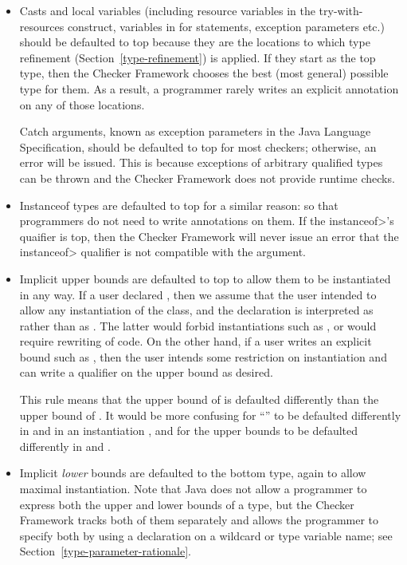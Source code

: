 \begin{itemize}
\item
Casts and local variables (including resource variables in the
try-with-resources construct, variables in for statements, exception parameters etc.)
should be defaulted to top because they are the locations to
which type refinement (Section~\ref{type-refinement}) is applied.  If they
start as the top type, then the Checker Framework chooses the best (most
general) possible type for them.  As a result, a programmer rarely writes
an explicit annotation on any of those locations.

Catch arguments, known as exception parameters in the Java Language Specification,
should be defaulted to top for most checkers; otherwise, an error will be issued.  This is because
exceptions of arbitrary qualified types can be thrown and the Checker Framework
does not provide runtime checks.


\item
Instanceof types are defaulted to top for a similar reason:  so that
programmers do not need to write annotations on them.  If the
\<instanceof>'s quaifier is top, then the Checker Framework will never
issue an error that the \<instanceof> qualifier is not compatible with the
argument.

\item
Implicit upper bounds are defaulted to top to allow them to be instantiated
in any way.  If a user declared , then
we assume that the user intended to allow any instantiation of the class,
and the declaration is interpreted as  rather than as .  The latter would forbid
instantiations such as , or would require
rewriting of code.  On the other hand, if a user writes an explicit bound
such as , then the user
intends some restriction on instantiation and can write a qualifier on the
upper bound as desired.

This rule means that the upper bound of  is defaulted
differently than the upper bound of .  It
would be more confusing for ``'' to be defaulted differently in  and in an
instantiation , and for the upper bounds to be defaulted
differently in  
and .

\item
Implicit \emph{lower} bounds are defaulted to the bottom type, again to allow
maximal instantiation.  Note that Java does not allow a programmer to
express both the upper and lower bounds of a type, but the Checker
Framework tracks both of them separately and allows the programmer to
specify both by using a declaration on a wildcard or type variable name;
see Section~\ref{type-parameter-rationale}.

\end{itemize}

